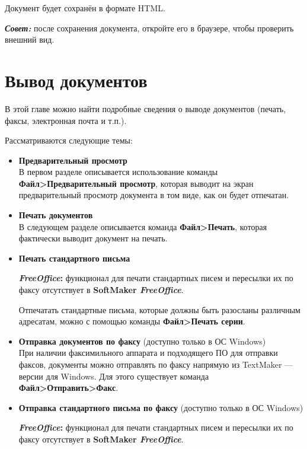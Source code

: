 ﻿\documentclass[a4paper,10pt]{article}
\begin{document}
Документ будет сохранён в формате HTML.

\begin{mdframed}[backgroundcolor=blue!10]
\textbf{\textit{Совет:}} после сохранения документа, откройте его в браузере, чтобы проверить внешний вид.
\end{mdframed}

\section{Вывод документов} \label{sec:выводдокументов}
В этой главе можно найти подробные сведения о выводе документов (печать, факсы, электронная почта и т.п.).

Рассматриваются следующие темы:
\begin{itemize}
 \item \textbf{Предварительный просмотр}\\
 В первом разделе описывается использование команды \textbf{Файл>Предварительный просмотр}, которая выводит на экран предварительный просмотр документа в том виде, как он будет отпечатан.
 \item \textbf{Печать документов}\\
 В следующем разделе описывается команда \textbf{Файл>Печать}, которая фактически выводит документ на печать.
 \item \textbf{Печать стандартного письма}\\
 \begin{mdframed}[backgroundcolor=pink!50]
\textbf{\textit{FreeOffice}:} функционал для печати стандартных писем и пересылки их по факсу отсутствует в \textbf{SoftMaker \textit{FreeOffice}}.
\end{mdframed}
Отпечатать стандартные письма, которые должны быть разосланы различным адресатам, можно с помощью команды \textbf{Файл>Печать серии}.
\item \textbf{Отправка документов по факсу} (доступно только в ОС Windows)\\
При наличии факсимильного аппарата и подходящего ПО для отправки факсов, документы можно отправлять по факсу напрямую из TextMaker — версии для Windows. Для этого существует команда \textbf{Файл>Отправить>Факс}.
\item \textbf{Отправка стандартного письма по факсу} (доступно только в ОС Windows)\\
 \begin{mdframed}[backgroundcolor=pink!50]
\textbf{\textit{FreeOffice}:} функционал для печати стандартных писем и пересылки их по факсу отсутствует в \textbf{SoftMaker \textit{FreeOffice}}.

\end{mdframed}
\end{itemize}
\end{document}
